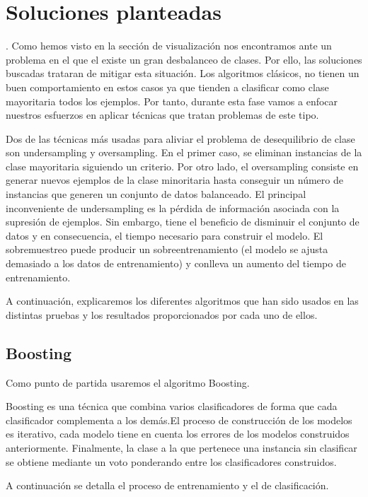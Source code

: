 \chapter{Soluciones planteadas}.
Como hemos visto en la sección de visualización nos encontramos ante un problema
en el que el existe un gran desbalanceo de clases. Por ello, las soluciones
buscadas trataran de mitigar esta situación. Los algoritmos clásicos, no tienen
un buen comportamiento en estos casos ya que tienden a clasificar como clase mayoritaria todos los ejemplos. Por tanto, durante esta fase vamos a enfocar nuestros esfuerzos en aplicar técnicas que tratan problemas de este tipo.

Dos de las técnicas más usadas para aliviar el
problema de desequilibrio de clase son undersampling y oversampling. En el primer caso, se eliminan instancias de la clase mayoritaria siguiendo un criterio. Por otro lado, el oversampling consiste en generar nuevos ejemplos de la clase minoritaria hasta conseguir un número de instancias que generen un conjunto de datos balanceado. El principal inconveniente de undersampling es la pérdida
de información asociada con la supresión de ejemplos. Sin embargo, tiene el beneficio de disminuir el conjunto de datos y en consecuencia, el tiempo necesario para construir el modelo. El sobremuestreo puede producir un sobreentrenamiento (el modelo se ajusta demasiado a los datos de entrenamiento) y conlleva un aumento del tiempo de entrenamiento.

A continuación, explicaremos los diferentes algoritmos que han sido usados en las distintas pruebas y los resultados proporcionados por cada uno de ellos.


\section{Boosting}
Como punto de partida usaremos el algoritmo Boosting.

\medskip

Boosting es una técnica que combina varios clasificadores de forma que cada clasificador complementa a los demás.El proceso de construcción de los modelos es iterativo, cada modelo tiene en cuenta los errores de los modelos construidos anteriormente. Finalmente, la clase a la que pertenece una instancia sin clasificar se obtiene mediante un voto ponderando entre los clasificadores construidos. 
\medskip

A continuación se detalla el proceso de entrenamiento y el de clasificación.

